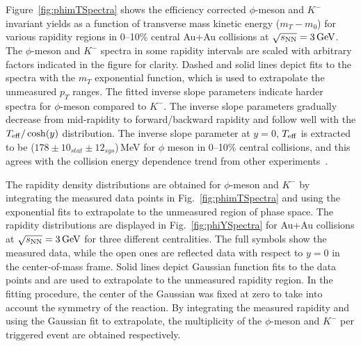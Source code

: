 \documentclass[%
 reprint,	
showpacs,
 amsmath,amssymb,
 aps,
 prc,
]{revtex4-1}
\begin{document}
Figure~\ref{fig:phimTSpectra} shows the efficiency corrected $\phi$-meson and $K^-$ invariant yields as a function of transverse mass kinetic energy ($m_T-m_0$) for various rapidity regions in 0--10\% central Au+Au collisions at ${\sqrt{s_{\rm NN}} = \rm{3\,GeV}}$. The $\phi$-meson and $K^-$ spectra in some rapidity intervals are scaled with arbitrary factors indicated in the figure for clarity. Dashed and solid lines depict fits to the spectra with the $m_T$ exponential function, which is used to extrapolate the unmeasured $p_T$ ranges. The fitted inverse slope parameters indicate harder spectra for $\phi$-meson compared to $K^-$. The inverse slope parameters gradually decrease from mid-rapidity to forward/backward rapidity and follow well with the $T_{\rm eff}/\cosh(y)$ distribution. The inverse slope parameter at $y=0$, $T_{\rm eff}$ is extracted to be ($178\pm10_{stat}\pm12_{sys}$)\,MeV for $\phi$ meson in 0--10\% central collisions, and this agrees with the collision energy dependence trend from other experiments~\cite{HADES_phi_AuAu,FOPI_phi_NiNi,FOPI_phi_AlAl,HADES_phi_ArKCl,NA49_phi}.


The rapidity density distributions are obtained for $\phi$-meson and $K^-$ by integrating the measured data points in Fig.~\ref{fig:phimTSpectra} and using the exponential fits to extrapolate to the unmeasured region of phase space. The rapidity distributions are displayed in Fig.~\ref{fig:phiYSpectra} for Au+Au collisions at ${\sqrt{s_{\rm NN}} = \rm{3\,GeV}}$ for three different centralities. The full symbols show the measured data, while the open ones are reflected data with respect to $y=0$ in the center-of-mass frame. Solid lines depict Gaussian function fits to the data points and are used to extrapolate to the unmeasured rapidity region. In the fitting procedure, the center of the Gaussian was fixed at zero to take into account the symmetry of the reaction. By integrating the measured rapidity and using the Gaussian fit to extrapolate, the multiplicity of the $\phi$-meson and $K^-$ per triggered event are obtained respectively.
\end{document}
